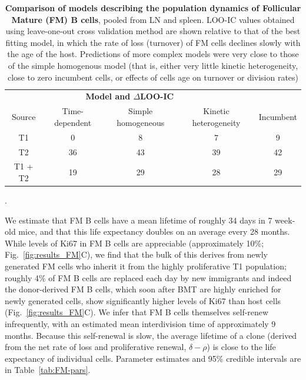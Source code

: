 \documentclass[11pt]{article}
\newcommand{\red}[1]{{\color{red}{#1}}}
\newcommand{\looic}{$\Delta$LOO-IC}
\begin{document}
 

	\begin{table}[htbp]
		\begin{center}
			\renewcommand{\arraystretch}{1.25}
			\begin{tabular}{c c c c c} 
				\toprule 
				\multicolumn{4}{c}{\textbf{Model and {\looic}}} \\
				\cline{2-5}
				Source &{\small Time-dependent}  & {\small Simple homogeneous} &  {\small Kinetic heterogeneity} & {\small Incumbent} \\ 
				\toprule
				T1      &   0             &              8             &                7              &          9         \\ 
				T2      &   36            &              43            &                39             &          42        \\ 
				T1 + T2 &   19            &              29            &                28             &          29        \\ 
				\hline
				\toprule 
			\end{tabular}
		\end{center}
		\caption{ \textbf{Comparison of models describing the population dynamics of Follicular Mature (FM) B cells}, pooled from LN and spleen. \red{switch to model weights, or add them} LOO-IC values obtained using leave-one-out cross validation method are shown relative to that of the best fitting model, in which the rate of loss  (turnover) of FM cells declines slowly with the age of the host. Predictions of more complex models were very close to those of the simple homogenous model (that is, either very little kinetic heterogeneity, close to zero incumbent cells, or effects of cells age on turnover or division rates)}. 
		\label{tab:FM-AICs}
	\end{table} 
	
	
We estimate that FM B cells  have a mean lifetime of roughly 34 days in 7 week-old mice, and that this life expectancy doubles on an average every 28 months. While levels of Ki67 in FM B cells are appreciable (approximately 10\%; Fig.~\ref{fig:results_FM}C), we find that the bulk of this derives from newly generated FM cells who inherit it from the highly proliferative T1 population; roughly 4\% of FM B cells are replaced each day by new immigrants and indeed the donor-derived FM B cells, which soon after BMT are highly enriched for newly generated cells, show significantly higher levels of Ki67 than host cells (Fig.~\ref{fig:results_FM}C).  We infer that FM B cells themselves self-renew infrequently, with an estimated mean interdivision time of approximately 9 months.  Because this self-renewal  is slow, the average lifetime of a clone (derived from the net rate of loss and proliferative renewal, $\delta-\rho$) is close to the life expectancy of individual cells. Parameter estimates and 95\% credible intervals are in Table~\ref{tab:FM-pars}.
	
\end{document}
